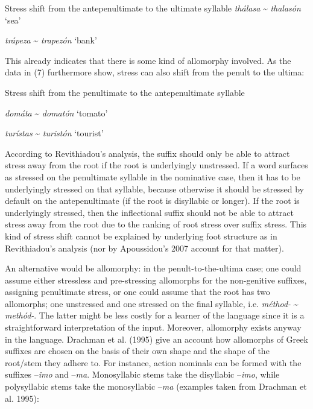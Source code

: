 \documentclass[a4paper]{article}
\begin{document}
\ea Stress shift from the antepenultimate to the ultimate syllable
{
\textit{thálasa} \~{} \textit{thalasón} ‘sea’}

{
\textit{trápeza} \~{} \textit{trapezón} ‘bank’}
\z

This already indicates that there is some kind of allomorphy involved. As the data in (7) furthermore show, stress can also shift from the penult to the ultima:


\ea Stress shift from the penultimate to the antepenultimate syllable

{
\textit{domáta} \~{} \textit{domatón} ‘tomato’}

{
\textit{turístas} \~{} \textit{turistón} ‘tourist’}
\z

According to Revithiadou’s analysis, the suffix should only be able to attract stress away from the root if the root is underlyingly unstressed. If a word surfaces as stressed on the penultimate syllable in the nominative case, then it has to be underlyingly stressed on that syllable, because otherwise it should be stressed by default on the antepenultimate (if the root is disyllabic or longer). If the root is underlyingly stressed, then the inflectional suffix should not be able to attract stress away from the root due to the ranking of root stress over suffix stress. This kind of stress shift cannot be explained by underlying foot structure as in Revithiadou’s analysis (nor by Apoussidou’s 2007 account for that matter).


An alternative would be allomorphy: in the penult-to-the-ultima case; one could assume either stressless and pre-stressing allomorphs for the non-genitive suffixes, assigning penultimate stress, or one could assume that the root has two allomorphs; one unstressed and one stressed on the final syllable, i.e. \textit{méthod-} \~{} \textit{methód-}. The latter might be less costly for a learner of the language since it is a straightforward interpretation of the input. Moreover, allomorphy exists anyway in the language. Drachman et al. (1995) give an account how allomorphs of Greek suffixes are chosen on the basis of their own shape and the shape of the root/stem they adhere to. For instance, action nominals can be formed with the suffixes –\textit{imo} and –\textit{ma}. Monosyllabic stems take the disyllabic –\textit{imo}, while polysyllabic stems take the monosyllabic –\textit{ma} (examples taken from Drachman et al. 1995):
\end{document}
